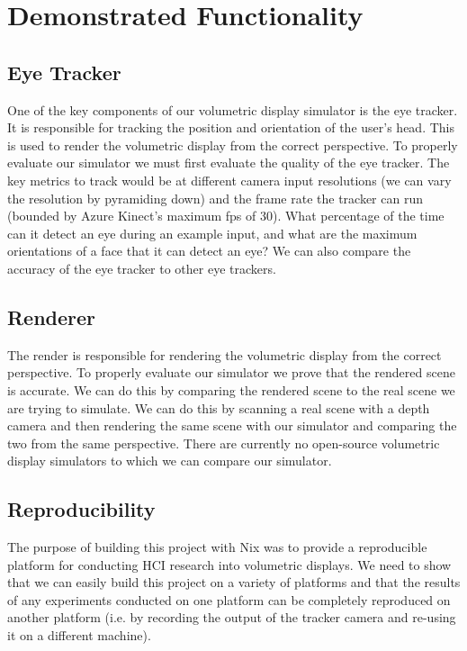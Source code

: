 \section{Demonstrated Functionality}
\subsection{Eye Tracker}
One of the key components of our volumetric display simulator is the eye tracker. It is responsible for tracking the position and orientation of the user's head. This is used to render the volumetric display from the correct perspective. To properly evaluate our simulator we must first evaluate the quality of the eye tracker. The key metrics to track would be at different camera input resolutions (we can vary the resolution by pyramiding down) and the frame rate the tracker can run (bounded by Azure Kinect's maximum fps of 30). What percentage of the time can it detect an eye during an example input, and what are the maximum orientations of a face that it can detect an eye? We can also compare the accuracy of the eye tracker to other eye trackers.

\subsection{Renderer}
The render is responsible for rendering the volumetric display from the correct perspective. To properly evaluate our simulator we prove that the rendered scene is accurate. We can do this by comparing the rendered scene to the real scene we are trying to simulate. We can do this by scanning a real scene with a depth camera and then rendering the same scene with our simulator and comparing the two from the same perspective. There are currently no open-source volumetric display simulators to which we can compare our simulator.

\subsection{Reproducibility}
The purpose of building this project with Nix was to provide a reproducible platform for conducting HCI research into volumetric displays. We need to show that we can easily build this project on a variety of platforms and that the results of any experiments conducted on one platform can be completely reproduced on another platform (i.e. by recording the output of the tracker camera and re-using it on a different machine). 

